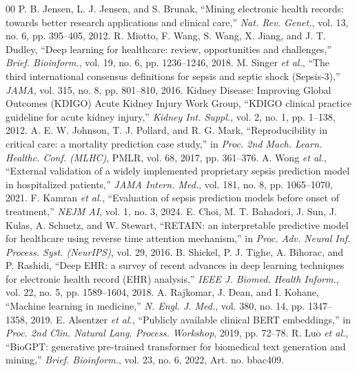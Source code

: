 \documentclass[conference]{IEEEtran}
\begin{document}
\begin{thebibliography}{00}
 P. B. Jensen, L. J. Jensen, and S. Brunak, ``Mining electronic health records: towards better research applications and clinical care,'' \textit{Nat. Rev. Genet.}, vol. 13, no. 6, pp. 395--405, 2012.
 R. Miotto, F. Wang, S. Wang, X. Jiang, and J. T. Dudley, ``Deep learning for healthcare: review, opportunities and challenges,'' \textit{Brief. Bioinform.}, vol. 19, no. 6, pp. 1236--1246, 2018.
 M. Singer \textit{et al.}, ``The third international consensus definitions for sepsis and septic shock (Sepsis-3),'' \textit{JAMA}, vol. 315, no. 8, pp. 801--810, 2016.
 Kidney Disease: Improving Global Outcomes (KDIGO) Acute Kidney Injury Work Group, ``KDIGO clinical practice guideline for acute kidney injury,'' \textit{Kidney Int. Suppl.}, vol. 2, no. 1, pp. 1--138, 2012.
 A. E. W. Johnson, T. J. Pollard, and R. G. Mark, ``Reproducibility in critical care: a mortality prediction case study,'' in \textit{Proc. 2nd Mach. Learn. Healthc. Conf. (MLHC)}, PMLR, vol. 68, 2017, pp. 361--376.
 A. Wong \textit{et al.}, ``External validation of a widely implemented proprietary sepsis prediction model in hospitalized patients,'' \textit{JAMA Intern. Med.}, vol. 181, no. 8, pp. 1065--1070, 2021.
 F. Kamran \textit{et al.}, ``Evaluation of sepsis prediction models before onset of treatment,'' \textit{NEJM AI}, vol. 1, no. 3, 2024.
 E. Choi, M. T. Bahadori, J. Sun, J. Kulas, A. Schuetz, and W. Stewart, ``RETAIN: an interpretable predictive model for healthcare using reverse time attention mechanism,'' in \textit{Proc. Adv. Neural Inf. Process. Syst. (NeurIPS)}, vol. 29, 2016.
 B. Shickel, P. J. Tighe, A. Bihorac, and P. Rashidi, ``Deep EHR: a survey of recent advances in deep learning techniques for electronic health record (EHR) analysis,'' \textit{IEEE J. Biomed. Health Inform.}, vol. 22, no. 5, pp. 1589--1604, 2018.
 A. Rajkomar, J. Dean, and I. Kohane, ``Machine learning in medicine,'' \textit{N. Engl. J. Med.}, vol. 380, no. 14, pp. 1347--1358, 2019.
 E. Alsentzer \textit{et al.}, ``Publicly available clinical BERT embeddings,'' in \textit{Proc. 2nd Clin. Natural Lang. Process. Workshop}, 2019, pp. 72--78.
 R. Luo \textit{et al.}, ``BioGPT: generative pre-trained transformer for biomedical text generation and mining,'' \textit{Brief. Bioinform.}, vol. 23, no. 6, 2022, Art. no. bbac409.

\end{thebibliography}
\end{document}
